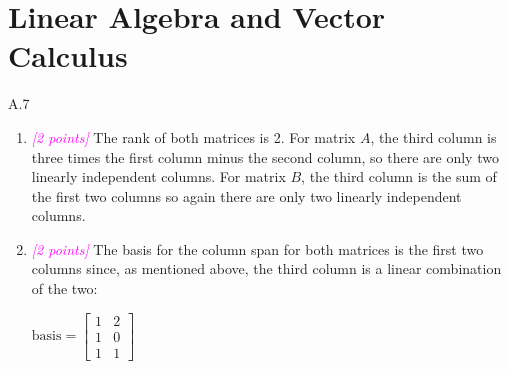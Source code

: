 \documentclass{article}
\newcommand{\1}{\mathbf{1}}
\newcommand{\points}[1]{\small\textcolor{magenta}{\emph{[#1 points]}} \normalsize}
\begin{document}
\section*{Linear Algebra and Vector Calculus}
A.7 
\begin{enumerate} 
	\item \points{2} The rank of both matrices is 2. For matrix $A$, the third column is three times the first column minus the second column, so there are only two linearly independent columns. For matrix $B$, the third column is the sum of the first two columns so again there are only two linearly independent columns. 
	
	\item \points{2} The basis for the column span for both matrices is the first two columns since, as mentioned above, the third column is a linear combination of the two:
	\begin{center}
		$\text{basis}=\begin{bmatrix}1 & 2 \\ 1 & 0 \\ 1 & 1 \end{bmatrix}$
	\end{center}
	
\end{enumerate}
\end{document}
